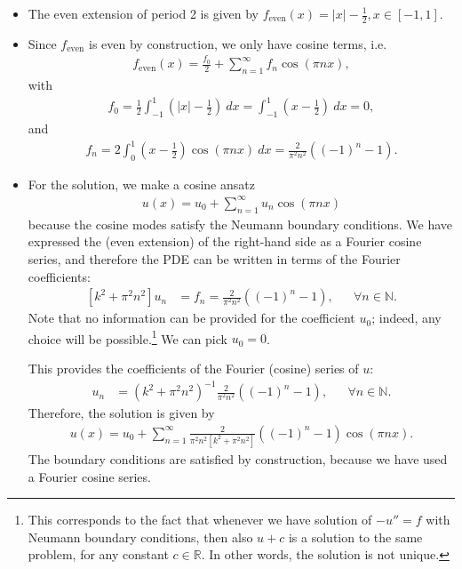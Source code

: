 \documentclass[11pt]{article}
\begin{document}
\begin{solution}
    \begin{itemize}
        \item The even extension of period 2 is given by $f_{\text{even}}(x) = |x| - \frac 1 2, x \in [-1, 1]$.
        \item Since $f_{\text{even}}$ is even by construction, we only have cosine terms, i.e.
        \begin{align*}
            f_{\text{even}}(x) = \frac{f_0}{2} + \sum_{n=1}^{\infty} f_n \cos(\pi n x),
        \end{align*}
        with
        \begin{align*}
            f_0 = \frac{1}{2} \int_{-1}^{1} (|x| - \frac 1 2) \ dx = \int_{-1}^1 (x - \frac 1 2) \ dx = 0,
        \end{align*}
        and
        \begin{align*}
            f_n = 2 \int_{0}^{1} (x- \frac 1 2) \cos(\pi n x) \ dx = \frac{2}{\pi^2 n^2}\left( (-1)^n - 1 \right).
        \end{align*}
        \item 
        For the solution, we make a cosine ansatz 
        \begin{align*}
            u(x) = u_0 + \sum_{n=1}^{\infty} u_n \cos(\pi n x)
        \end{align*}
        because the cosine modes satisfy the Neumann boundary conditions. 
        We have expressed the (even extension) of the right-hand side as a Fourier cosine series,
        and therefore the PDE can be written in terms of the Fourier coefficients:
        \begin{align*}
            \left [k^2 + \pi^2 n^2 \right]u_n &= f_n = \frac{2}{\pi^2 n^2}\left( (-1)^n - 1 \right), & & \forall n \in \mathbb{N}.
        \end{align*}
        Note that no information can be provided for the coefficient $u_0$; indeed, any choice will be possible.\footnote{This corresponds to the fact that whenever we have solution of $-u'' = f$ with Neumann boundary conditions, then also $u+c$ is a solution to the same problem, for any constant $c \in \mathbb R$. In other words, the solution is not unique.} We can pick $u_0 = 0$. 
        
        This provides the coefficients of the Fourier (cosine) series of $u$:
        \begin{align*}
            u_n &= \left( k^2 + \pi^2 n^2 \right)^{-1} \frac{2}{\pi^2 n^2}\left( (-1)^n - 1 \right), & & \forall n \in \mathbb{N}.
        \end{align*}
        Therefore, the solution is given by 
        \begin{align*}
            u(x) = u_0 + \sum_{n=1}^{\infty} \frac{2}{\pi^2 n^2 \left[k^2 + \pi^2 n^2 \right]}\left( (-1)^n - 1 \right) \cos(\pi n x).
        \end{align*}
        The boundary conditions are satisfied by construction, because we have used a Fourier cosine series. 
    \end{itemize}
\end{solution}
\end{document}
